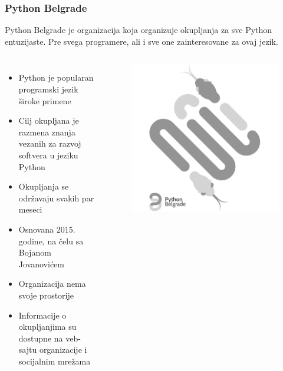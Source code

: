 \documentclass[hyperref={bookmarks=false},aspectratio=169]{beamer}
\begin{document}
\begin{frame}
\frametitle{Python Belgrade}
Python Belgrade je organizacija koja organizuje okupljanja za sve Python entuzijaste. Pre svega programere, ali i sve one zainteresovane za ovaj jezik.

\begin{columns}[T]

\begin{itemize}
    \item Python je popularan programski jezik široke primene
    \item Cilj okupljana je razmena znanja vezanih za razvoj softvera u jeziku Python
    \item Okupljanja se održavaju svakih par meseci
    \item Osnovana 2015. godine, na čelu sa Bojanom Jovanovićem
    \item Organizacija nema svoje prostorije
    \item Informacije o okupljanjima su dostupne na veb-sajtu organizacije i socijalnim mrežama
\end{itemize}

\begin{figure}
    \raggedleft
    \includegraphics[scale=0.075]{./images/pybgd.png}
\end{figure}

\end{columns}

\end{frame}
\end{document}

